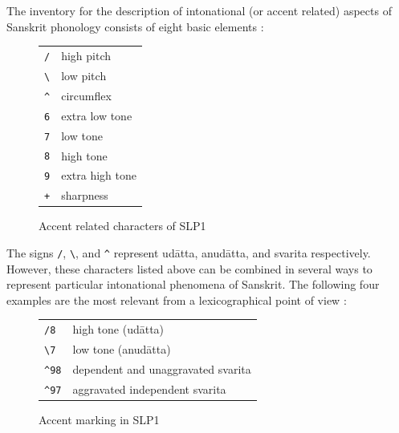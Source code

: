 The inventory for the description of intonational (or accent related) aspects of Sanskrit phonology consists of eight basic elements \citep[p.~154]{ScharfHyman2011}:

\begin{figure}[!ht]
\begin{center}
\begingroup
\setlength{\tabcolsep}{10pt} %
\renewcommand{\arraystretch}{1.5} %
\begin{tabular}{ll}
\texttt{/} &	high pitch\\
\texttt{\textbackslash} & low pitch\\
\texttt{\textasciicircum} & circumflex\\
\texttt{6} & extra low tone\\
\texttt{7} & low tone\\
\texttt{8} & high tone\\
\texttt{9} & extra high tone\\
\texttt{+} & sharpness\\
\end{tabular}
\endgroup
\end{center}
\caption[Accent related characters of SLP1]{\label{tab:slp1int}Accent related characters of SLP1}
\end{figure}


The signs \texttt{/}, \texttt{\textbackslash}, and \texttt{\textasciicircum} represent udātta, anudātta, and svarita respectively. However, these characters listed above can be combined in several ways to represent particular intonational phenomena of Sanskrit. The following four examples are the most relevant from a lexicographical point of view \citep[p.~155]{ScharfHyman2011}:


\begin{figure}[!ht]
\begin{center}
\begingroup
\setlength{\tabcolsep}{10pt} %
\renewcommand{\arraystretch}{1.5} %
\begin{tabular}{ll}
\texttt{/8} & high tone (udātta)\\
\texttt{\textbackslash 7} & low tone (anudātta)\\
\texttt{\textasciicircum 98} & dependent and unaggravated svarita\\
\texttt{\textasciicircum 97} & aggravated independent svarita
\end{tabular}
\endgroup
\end{center}
\caption[Accent marking in SLP1]{\label{tab:slp1cc}Accent marking in SLP1}
\end{figure}


